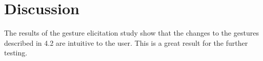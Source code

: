 \chapter{Discussion}

The results of the gesture elicitation study show that the changes to the gestures described in 4.2 are intuitive to the user. %
This is a great result for the further testing.
